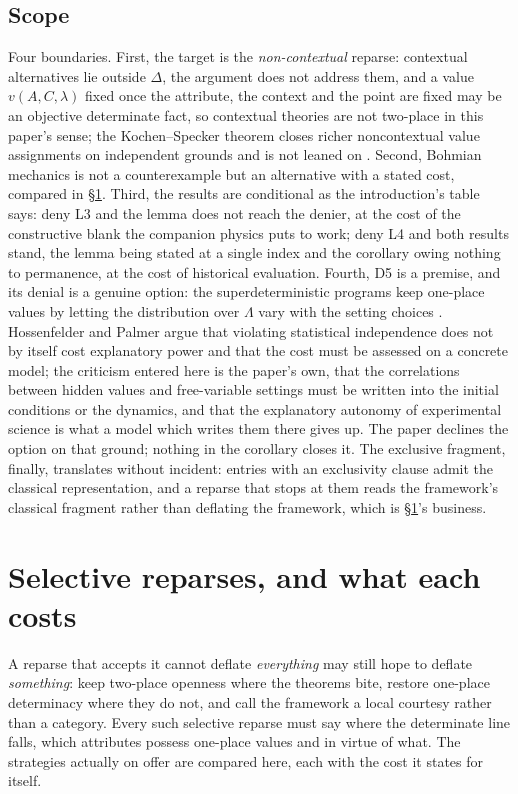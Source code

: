\subsection{Scope}\label{sec:scope}

Four boundaries. First, the target is the \emph{non-contextual} reparse: contextual alternatives lie outside $\Delta$, the argument does not address them, and a value $v(A, C, \lambda)$ fixed once the attribute, the context and the point are fixed may be an objective determinate fact, so contextual theories are not two-place in this paper's sense; the Kochen--Specker theorem closes richer noncontextual value assignments on independent grounds and is not leaned on \cite{kochen1967problem}. Second, Bohmian mechanics is not a counterexample but an alternative with a stated cost, compared in \S\ref{sec:hatch}. Third, the results are conditional as the introduction's table says: deny L3 and the lemma does not reach the denier, at the cost of the constructive blank the companion physics puts to work; deny L4 and both results stand, the lemma being stated at a single index and the corollary owing nothing to permanence, at the cost of historical evaluation. Fourth, D5 is a premise, and its denial is a genuine option: the superdeterministic programs keep one-place values by letting the distribution over $\Lambda$ vary with the setting choices \cite{thooft2016cellular, hossenfelder2020rethinking}. Hossenfelder and Palmer argue that violating statistical independence does not by itself cost explanatory power and that the cost must be assessed on a concrete model; the criticism entered here is the paper's own, that the correlations between hidden values and free-variable settings must be written into the initial conditions or the dynamics, and that the explanatory autonomy of experimental science is what a model which writes them there gives up. The paper declines the option on that ground; nothing in the corollary closes it. The exclusive fragment, finally, translates without incident: entries with an exclusivity clause admit the classical representation, and a reparse that stops at them reads the framework's classical fragment rather than deflating the framework, which is \S\ref{sec:hatch}'s business.

\section{Selective reparses, and what each costs}\label{sec:hatch}

A reparse that accepts it cannot deflate \emph{everything} may still hope to deflate \emph{something}: keep two-place openness where the theorems bite, restore one-place determinacy where they do not, and call the framework a local courtesy rather than a category. Every such selective reparse must say where the determinate line falls, which attributes possess one-place values and in virtue of what. The strategies actually on offer are compared here, each with the cost it states for itself.

